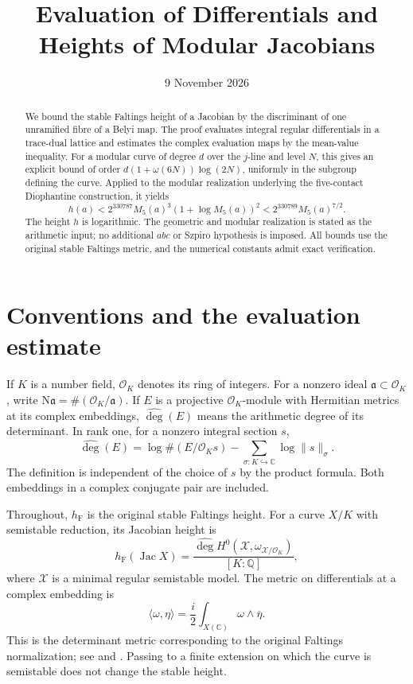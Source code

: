 \documentclass[11pt,a4paper]{article}
\title{Evaluation of Differentials and Heights of Modular Jacobians}
\author{}
\date{9 November 2026}
\theoremstyle{definition}
\newcommand{\Q}{\mathbb Q}
\newcommand{\C}{\mathbb C}
\newcommand{\hF}{h_{\mathrm F}}
\newcommand{\OK}{\mathcal O_K}
\newcommand{\Jac}{\operatorname{Jac}}
\newcommand{\Ardeg}{\widehat{\deg}}
\begin{document}
\maketitle
\begin{abstract}
We bound the stable Faltings height of a Jacobian by the discriminant
of one unramified fibre of a Belyi map. The proof evaluates integral
regular differentials in a trace-dual lattice and estimates the
complex evaluation maps by the mean-value inequality. For a modular
curve of degree $d$ over the $j$-line and level $N$, this gives an
explicit bound of order $d(1+\omega(6N))\log(2N)$, uniformly in the
subgroup defining the curve. Applied to the modular realization
underlying the five-contact Diophantine construction, it yields
\[
 h(a)<2^{330787}M_5(a)^3(1+\log M_5(a))^2
       <2^{330789}M_5(a)^{7/2}.
\]
The height $h$ is logarithmic. The geometric and modular realization
is stated as the arithmetic input; no additional $abc$ or Szpiro
hypothesis is imposed. All bounds use the original stable Faltings
metric, and the numerical constants admit exact verification.
\end{abstract}

\section{Conventions and the evaluation estimate}

If $K$ is a number field, $\OK$ denotes its ring of integers.
For a nonzero ideal $\mathfrak a\subset\OK$, write
$\mathrm N\mathfrak a=\#(\OK/\mathfrak a)$.
If $E$ is a projective $\OK$-module with Hermitian metrics at
its complex embeddings, $\Ardeg(E)$ means the arithmetic degree
of its determinant. In rank one, for a nonzero integral section $s$,
\[
 \Ardeg(E)=\log\#(E/\OK s)
                  -\sum_{\sigma:K\hookrightarrow\C}\log\|s\|_\sigma.
\]
The definition is independent of the choice of $s$ by the product
formula. Both embeddings in a complex conjugate pair are included.

Throughout, $\hF$ is the original stable Faltings height.
For a curve $X/K$ with semistable reduction, its Jacobian height is
\begin{equation}\label{eq:height-convention}
 \hF(\Jac X)=\frac{\Ardeg H^0(\mathcal X,
                                  \omega_{\mathcal X/\OK})}{[K:\Q]},
\end{equation}
where $\mathcal X$ is a minimal regular semistable model. The metric
on differentials at a complex embedding is
\[
 \langle\omega,\eta\rangle
       =\frac i2\int_{X(\C)}\omega\wedge\overline\eta.
\]
This is the determinant metric corresponding to the original Faltings
normalization; see \cite[Sections~2.1 and~2.3]{Javanpeykar} and
\cite[Section~2.1]{vonKaenel}. Passing to a finite extension on which
the curve is semistable does not change the stable height.
\end{document}
